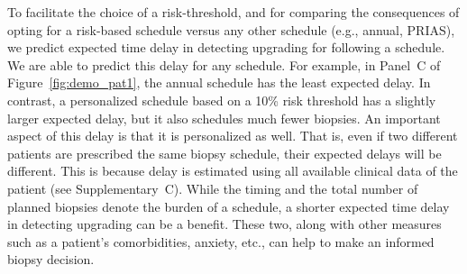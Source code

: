 To facilitate the choice of a risk-threshold, and for comparing the consequences of opting for a risk-based schedule versus any other schedule (e.g., annual, PRIAS), we predict expected time delay in detecting upgrading for following a schedule. We are able to predict this delay for any schedule. For example, in Panel~C of Figure~\ref{fig:demo_pat1}, the annual schedule has the least expected delay. In contrast, a personalized schedule based on a 10\% risk threshold has a slightly larger expected delay, but it also schedules much fewer biopsies. An important aspect of this delay is that it is personalized as well. That is, even if two different patients are prescribed the same biopsy schedule, their expected delays will be different. This is because delay is estimated using all available clinical data of the patient (see Supplementary~C). While the timing and the total number of planned biopsies denote the burden of a schedule, a shorter expected time delay in detecting upgrading can be a benefit. These two, along with other measures such as a patient's comorbidities, anxiety, etc., can help to make an informed biopsy decision.

